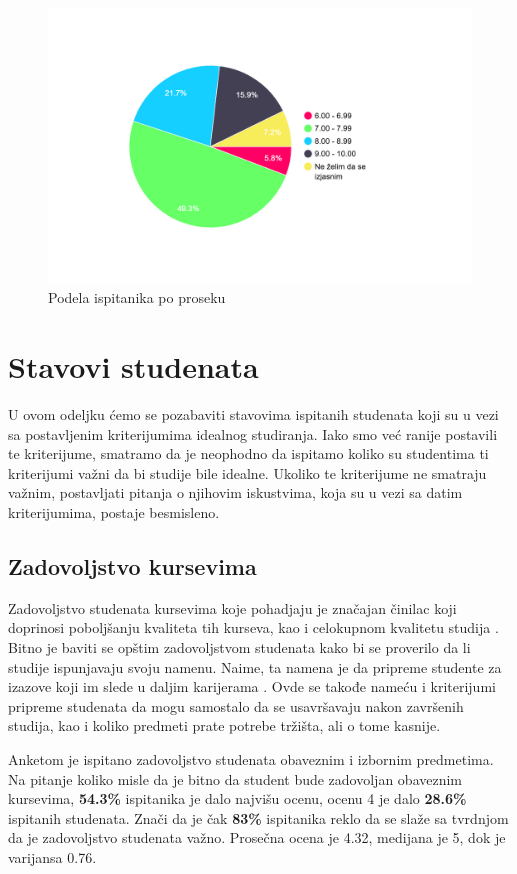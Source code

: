 \documentclass[a4paper]{article}
\begin{document}
{\begin{figure}[H]
    \centering
    \includegraphics[width=0.7\linewidth]{Slike/PieChartProsek.png}
    \caption{Podela ispitanika po proseku}
    \label{fig:raspodela_prosek}
\end{figure}

\section{Stavovi studenata}
\label{sec:stavovi}


U ovom odeljku ćemo se pozabaviti stavovima ispitanih studenata koji su u vezi sa postavljenim kriterijumima idealnog studiranja. Iako smo već ranije postavili te kriterijume, smatramo da je neophodno da ispitamo koliko su studentima ti kriterijumi važni da bi studije bile idealne. Ukoliko te kriterijume ne smatraju važnim, postavljati pitanja o njihovim iskustvima, koja su u vezi sa datim kriterijumima, postaje besmisleno.


\subsection{Zadovoljstvo kursevima}
\label{subsec:zadovoljstvo_stavovi}

Zadovoljstvo studenata kursevima koje pohadjaju je značajan činilac koji doprinosi poboljšanju kvaliteta tih kurseva, kao i celokupnom kvalitetu studija \cite{satisfaction}. Bitno je baviti se opštim zadovoljstvom studenata kako bi se proverilo da li studije ispunjavaju svoju namenu. Naime, ta namena je da pripreme studente za izazove koji im slede u daljim karijerama \cite{education}. Ovde se takođe nameću i kriterijumi pripreme studenata da mogu samostalo da se usavršavaju nakon završenih studija, kao i koliko predmeti prate potrebe tržišta, ali o tome kasnije.

Anketom je ispitano zadovoljstvo studenata obaveznim i izbornim predmetima. Na pitanje koliko misle da je bitno da student bude zadovoljan obaveznim kursevima, \textbf{54.3\%} ispitanika je dalo najvišu ocenu, ocenu 4 je dalo \textbf{28.6\%} ispitanih studenata. Znači da je čak \textbf{83\%} ispitanika reklo da se slaže sa tvrdnjom da je zadovoljstvo studenata važno. Prosečna ocena je 4.32, medijana je 5, dok je varijansa 0.76.

}
\end{document}
